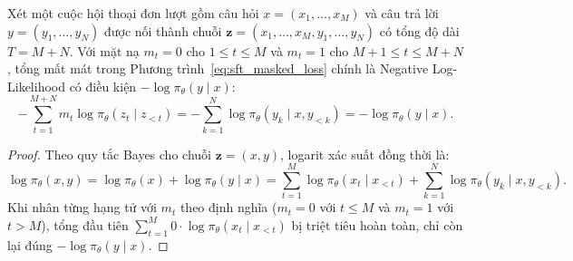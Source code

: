 \begin{proposition}
Xét một cuộc hội thoại đơn lượt gồm câu hỏi $x = (x_1, \dots, x_M)$ và câu trả lời $y = (y_1, \dots, y_N)$ được nối thành chuỗi $\mathbf{z} = (x_1, \dots, x_M, y_1, \dots, y_N)$ có tổng độ dài $T = M + N$. Với mặt nạ $m_t = 0$ cho $1 \le t \le M$ và $m_t = 1$ cho $M+1 \le t \le M+N$, tổng mất mát trong Phương trình~\eqref{eq:sft_masked_loss} chính là Negative Log-Likelihood có điều kiện $-\log \pi_\theta(y \mid x)$:
\begin{equation}
    -\sum_{t=1}^{M+N} m_t \log \pi_\theta(z_t \mid z_{<t}) = -\sum_{k=1}^{N} \log \pi_\theta(y_k \mid x, y_{<k}) = -\log \pi_\theta(y \mid x).
\end{equation}
\end{proposition}

\begin{proof}
Theo quy tắc Bayes cho chuỗi $\mathbf{z} = (x, y)$, logarit xác suất đồng thời là:
\begin{equation}
    \log \pi_\theta(x, y) = \log \pi_\theta(x) + \log \pi_\theta(y \mid x) = \sum_{t=1}^{M} \log \pi_\theta(x_t \mid x_{<t}) + \sum_{k=1}^{N} \log \pi_\theta(y_k \mid x, y_{<k}).
\end{equation}
Khi nhân từng hạng tử với $m_t$ theo định nghĩa ($m_t = 0$ với $t \le M$ và $m_t = 1$ với $t > M$), tổng đầu tiên $\sum_{t=1}^{M} 0 \cdot \log \pi_\theta(x_t \mid x_{<t})$ bị triệt tiêu hoàn toàn, chỉ còn lại đúng $-\log \pi_\theta(y \mid x)$.
\end{proof}

